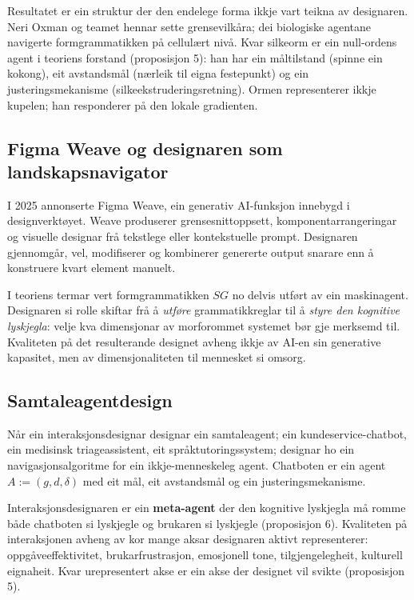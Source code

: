 Resultatet er ein struktur der den endelege forma ikkje vart teikna av designaren. Neri Oxman og teamet hennar sette grensevilkåra; dei biologiske agentane navigerte formgrammatikken på cellulært nivå. Kvar silkeorm er ein null-ordens agent i teoriens forstand (proposisjon 5): han har ein måltilstand (spinne ein kokong), eit avstandsmål (nærleik til eigna festepunkt) og ein justeringsmekanisme (silkeekstruderingsretning). Ormen representerer ikkje kupelen; han responderer på den lokale gradienten.

\subsection{Figma Weave og designaren som landskapsnavigator}

I 2025 annonserte Figma Weave, ein generativ AI-funksjon innebygd i designverktøyet. Weave produserer grensesnittoppsett, komponentarrangeringar og visuelle designar frå tekstlege eller kontekstuelle prompt. Designaren gjennomgår, vel, modifiserer og kombinerer genererte output snarare enn å konstruere kvart element manuelt.

I teoriens termar vert formgrammatikken $SG$ no delvis utført av ein maskinagent. Designaren si rolle skiftar frå å \textit{utføre} grammatikkreglar til å \textit{styre den kognitive lyskjegla}: velje kva dimensjonar av morforommet systemet bør gje merksemd til. Kvaliteten på det resulterande designet avheng ikkje av AI-en sin generative kapasitet, men av dimensjonaliteten til mennesket si omsorg.

\subsection{Samtaleagentdesign}

Når ein interaksjonsdesignar designar ein samtaleagent; ein kundeservice-chatbot, ein medisinsk triageassistent, eit språktutoringssystem; designar ho ein navigasjonsalgoritme for ein ikkje-menneskeleg agent. Chatboten er ein agent $A := (g, d, \delta)$ med eit mål, eit avstandsmål og ein justeringsmekanisme.

Interaksjonsdesignaren er ein \textbf{meta-agent} der den kognitive lyskjegla må romme både chatboten si lyskjegle og brukaren si lyskjegle (proposisjon 6). Kvaliteten på interaksjonen avheng av kor mange aksar designaren aktivt representerer: oppgåveeffektivitet, brukarfrustrasjon, emosjonell tone, tilgjengelegheit, kulturell eignaheit. Kvar urepresentert akse er ein akse der designet vil svikte (proposisjon 5).

